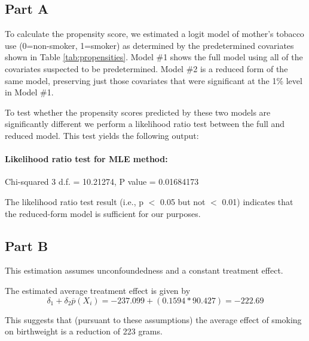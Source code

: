 \documentclass[letterpaper, 12pt]{article}
\begin{document}
\subsection{Part A}

To calculate the propensity score, we estimated a logit model of mother's tobacco use (0=non-smoker, 1=smoker) as determined by the predetermined covariates shown in Table \ref{tab:propensities}. Model \#1 shows the full model using all of the covariates suspected to be predetermined. Model \#2 is a reduced form of the same model, preserving just those covariates that were significant at the 1\% level in Model \#1. 

\let\clearpage\relax
 

To test whether the propensity scores predicted by these two models are significantly different  we perform a likelihood ratio test between  the full and reduced model. This test yields the following output:

\paragraph{Likelihood ratio test for MLE method:} Chi-squared 3 d.f. =  10.21274, P value =  0.01684173 

The likelihood ratio test result (i.e., p $<$ 0.05 but not $<$ 0.01) indicates that the reduced-form model is sufficient for our purposes.


\subsection{Part B}

This estimation assumes unconfoundedness and a constant treatment effect.




The estimated average treatment effect is given by 
\begin{equation}
\delta_1 + \delta_2 \overline{p}(X_i)=-237.099 + (0.1594 * 90.427)=-222.69
\end{equation}

This suggests that (pursuant to these assumptions) the average effect of smoking on birthweight is a reduction of 223 grams.
\end{document}

